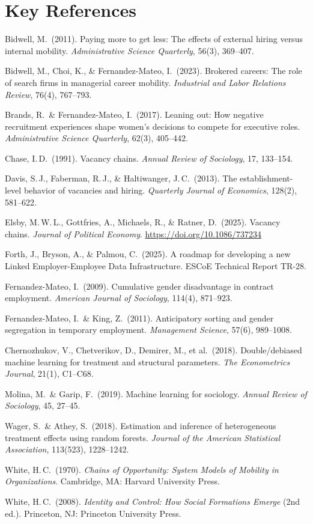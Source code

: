 \documentclass[a4paper]{tufte-handout}
\begin{document}
\section{Key References}

\small

\noindent
Bidwell, M.\ (2011). Paying more to get less: The effects of external hiring versus internal mobility. \emph{Administrative Science Quarterly}, 56(3), 369--407.

\smallskip\noindent
Bidwell, M., Choi, K., \& Fernandez-Mateo, I.\ (2023). Brokered careers: The role of search firms in managerial career mobility. \emph{Industrial and Labor Relations Review}, 76(4), 767--793.

\smallskip\noindent
Brands, R.\  \& Fernandez-Mateo, I.\ (2017). Leaning out: How negative recruitment experiences shape women's decisions to compete for executive roles. \emph{Administrative Science Quarterly}, 62(3), 405--442.

\smallskip\noindent
Chase, I.\,D.\ (1991). Vacancy chains. \emph{Annual Review of Sociology}, 17, 133--154.

\smallskip\noindent
Davis, S.\,J., Faberman, R.\,J., \& Haltiwanger, J.\,C.\ (2013). The establishment-level behavior of vacancies and hiring. \emph{Quarterly Journal of Economics}, 128(2), 581--622.

\smallskip\noindent
Elsby, M.\,W.\,L., Gottfries, A., Michaels, R., \& Ratner, D.\ (2025). Vacancy chains. \emph{Journal of Political Economy}. \url{https://doi.org/10.1086/737234}

\smallskip\noindent
Forth, J., Bryson, A., \& Palmou, C.\ (2025). A roadmap for developing a new Linked Employer-Employee Data Infrastructure. ESCoE Technical Report TR-28.

\smallskip\noindent
Fernandez-Mateo, I.\ (2009). Cumulative gender disadvantage in contract employment. \emph{American Journal of Sociology}, 114(4), 871--923.

\smallskip\noindent
Fernandez-Mateo, I.\  \& King, Z.\ (2011). Anticipatory sorting and gender segregation in temporary employment. \emph{Management Science}, 57(6), 989--1008.

\smallskip\noindent
Chernozhukov, V., Chetverikov, D., Demirer, M., et al.\ (2018). Double/debiased machine learning for treatment and structural parameters. \emph{The Econometrics Journal}, 21(1), C1--C68.

\smallskip\noindent
Molina, M.\  \& Garip, F.\ (2019). Machine learning for sociology. \emph{Annual Review of Sociology}, 45, 27--45.

\smallskip\noindent
Wager, S.\  \& Athey, S.\ (2018). Estimation and inference of heterogeneous treatment effects using random forests. \emph{Journal of the American Statistical Association}, 113(523), 1228--1242.

\smallskip\noindent
White, H.\,C.\ (1970). \emph{Chains of Opportunity: System Models of Mobility in Organizations}. Cambridge, MA: Harvard University Press.

\smallskip\noindent
White, H.\,C.\ (2008). \emph{Identity and Control: How Social Formations Emerge} (2nd ed.). Princeton, NJ: Princeton University Press.
\end{document}
